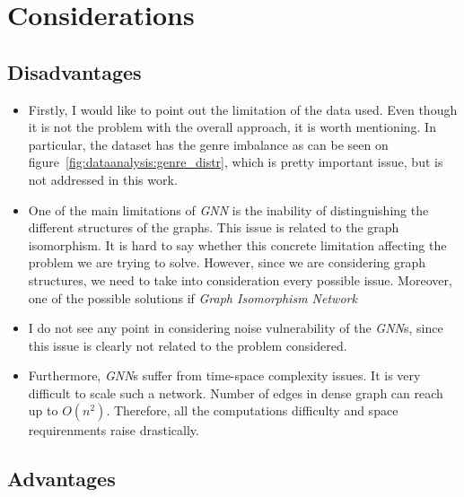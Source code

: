\section{Considerations}

\subsection{Disadvantages}

\begin{itemize}
    \item Firstly, I would like to point out the limitation of the data used. Even though
          it is not the problem with the overall approach, it is worth mentioning. In
          particular, the dataset has the genre imbalance as can be seen on
          figure~\ref{fig:dataanalysis:genre_distr}, which is pretty important issue, but
          is not addressed in this work.
    \item One of the main limitations of \textit{GNN} is the inability of distinguishing
          the different structures of the graphs. This issue is related to the graph
          isomorphism. It is hard to say whether this concrete limitation affecting the
          problem we are trying to solve. However, since we are considering graph
          structures, we need to take into consideration every possible issue. Moreover,
          one of the possible solutions if \textit{Graph Isomorphism
              Network}~\cite{xuHowPowerfulAre2019}
    \item I do not see any point in considering noise vulnerability of the \textit{GNN}s,
          since this issue is clearly not related to the problem considered.
    \item Furthermore, \textit{GNN}s suffer from time-space complexity issues. It is very
          difficult to scale such a network. Number of edges in dense graph can reach up
          to \(O(n^2)\). Therefore, all the computations difficulty and space
          requirenments raise drastically.
\end{itemize}

\subsection{Advantages}

